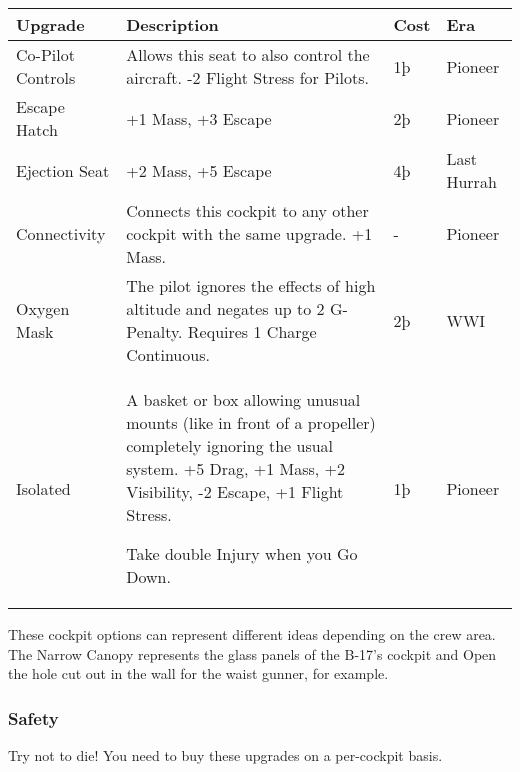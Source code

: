 \documentclass{article}
\begin{document}
\begin{tabular}{|l|l|l|l|}
  \hline
  Upgrade                                          & Description                                                 & Cost    & Era         \\\hline
  Co-Pilot Controls                                & Allows this seat to also control the aircraft. -2
  Flight Stress for Pilots.                        & 1þ                                                          & Pioneer               \\\hline
  Escape Hatch                                     & +1 Mass, +3 Escape                                          & 2þ      & Pioneer     \\\hline
  Ejection Seat                                    & +2 Mass, +5 Escape                                          & 4þ      & Last Hurrah \\\hline
  Connectivity                                     & Connects this cockpit to any other cockpit with the same
  upgrade. +1 Mass.                                & -                                                           & Pioneer               \\\hline
  Oxygen Mask                                      & The pilot ignores the effects of high altitude and negates
  up to 2 G-Penalty. Requires 1 Charge Continuous. & 2þ                                                          & WWI                   \\\hline
  Isolated                                         & A basket or box allowing unusual mounts (like in front of a
  propeller) completely ignoring the usual system. +5 Drag, +1 Mass, +2
  Visibility, -2 Escape, +1 Flight Stress.

  Take double Injury when you Go Down.             & 1þ                                                          & Pioneer               \\\hline
\end{tabular}

These cockpit options can represent different ideas depending on
the crew area. The Narrow Canopy represents the glass panels of the
B-17's cockpit and Open the hole cut out in the wall for the waist
gunner, for example.

\subsubsection{Safety}
\label{_Safety}

Try not to die! You need to buy these upgrades on a per-cockpit basis.
\end{document}
